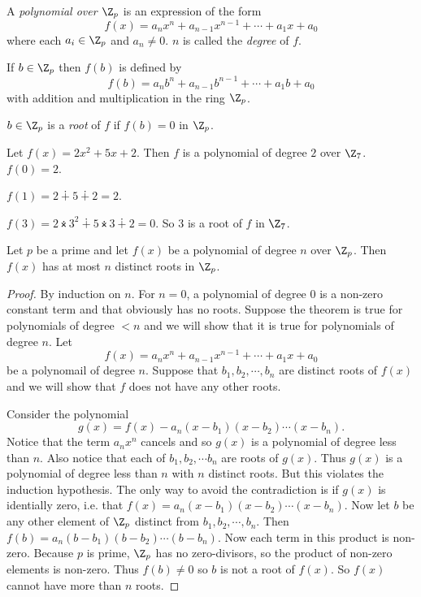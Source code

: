 \documentclass[oneside,12pt]{amsart}
\begin{document}
\begin{definition}
A \emph{polynomial over $\Z_p$} is an expression of the form
$$f(x) = a_nx^n + a_{n-1}x^{n-1} + \cdots + a_1x + a_0$$
where each $a_i\in\Z_p$ and $a_n\not=0$. $n$ is called the \emph{degree} of $f$.

If $b\in\Z_p$ then $f(b)$ is defined by
$$f(b) = a_nb^n + a_{n-1}b^{n-1} + \cdots + a_1b + a_0$$
with addition and multiplication in the ring $\Z_p$.

$b\in\Z_p$ is a \emph{root} of $f$ if $f(b)=0$ in $\Z_p$.
\end{definition}

\begin{example}
Let $f(x)=2x^2 + 5x + 2$. Then $f$ is a polynomial of degree $2$ over $\Z_7$.
$f(0)=2$.

$f(1)=2\dotplus 5 \dotplus 2 = 2$.

$f(3) = 2\dottimes 3^2 \dotplus 5\dottimes 3 \dotplus 2 = 0$.
So $3$ is a root of $f$ in $\Z_7$.
\end{example}

\begin{theorem}
Let $p$ be a prime and let $f(x)$ be a polynomial of degree $n$ over $\Z_p$. Then $f(x)$ has at
most $n$ distinct roots in $\Z_p$.
\end{theorem}
\begin{proof}
By induction on $n$. For $n=0$, a polynomial of degree 0 is a non-zero constant term and that obviously has no roots.
Suppose the theorem is true for polynomials of degree $<n$ and we will show that it is true for polynomials of degree $n$. Let
$$f(x) = a_nx^n + a_{n-1}x^{n-1} + \cdots + a_1x + a_0$$
be a polynomail of degree $n$. Suppose that $b_1,b_2,\cdots, b_n$ are distinct roots of $f(x)$ and we will show that $f$ does not have
any other roots.

Consider the polynomial
$$g(x)=f(x) - a_n(x-b_1)(x-b_2)\cdots(x-b_n).$$
Notice that the term $a_n x^n$ cancels and so $g(x)$ is a polynomial of degree less than $n$. Also notice that each of $b_1,b_2,\cdots b_n$
are roots of $g(x)$. Thus $g(x)$ is a polynomial of degree less than $n$ with $n$ distinct roots. But this violates the induction hypothesis.
The only way to avoid the contradiction is if $g(x)$ is identially zero, i.e. that $f(x) = a_n(x-b_1)(x-b_2)\cdots(x-b_n)$. Now let
$b$ be any other element of $\Z_p$ distinct from $b_1,b_2,\cdots,b_n$. Then $f(b)=a_n(b-b_1)(b-b_2)\cdots(b-b_n)$. Now each
term in this product is non-zero. Because $p$ is prime, $\Z_p$ has no zero-divisors, so the product of non-zero elements is non-zero.
Thus $f(b)\not=0$ so $b$ is not a root of $f(x)$. So $f(x)$ cannot have more than $n$ roots.
\end{proof}
\end{document}
